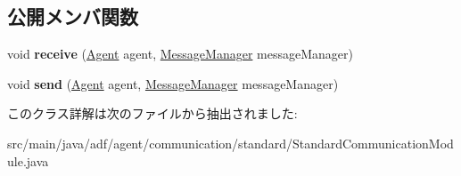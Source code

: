 \subsection*{公開メンバ関数}
\begin{DoxyCompactItemize}
\item 
\hypertarget{classadf_1_1agent_1_1communication_1_1standard_1_1StandardCommunicationModule_ada0c0f0a7092156d2d4c1e64792e683a}{}\label{classadf_1_1agent_1_1communication_1_1standard_1_1StandardCommunicationModule_ada0c0f0a7092156d2d4c1e64792e683a} 
void {\bfseries receive} (\hyperlink{classadf_1_1agent_1_1Agent}{Agent} agent, \hyperlink{classadf_1_1agent_1_1communication_1_1MessageManager}{Message\+Manager} message\+Manager)
\item 
\hypertarget{classadf_1_1agent_1_1communication_1_1standard_1_1StandardCommunicationModule_a0a11dffa4589a95226127fdd834d4ba0}{}\label{classadf_1_1agent_1_1communication_1_1standard_1_1StandardCommunicationModule_a0a11dffa4589a95226127fdd834d4ba0} 
void {\bfseries send} (\hyperlink{classadf_1_1agent_1_1Agent}{Agent} agent, \hyperlink{classadf_1_1agent_1_1communication_1_1MessageManager}{Message\+Manager} message\+Manager)
\end{DoxyCompactItemize}


このクラス詳解は次のファイルから抽出されました\+:\begin{DoxyCompactItemize}
\item 
src/main/java/adf/agent/communication/standard/Standard\+Communication\+Module.\+java\end{DoxyCompactItemize}
